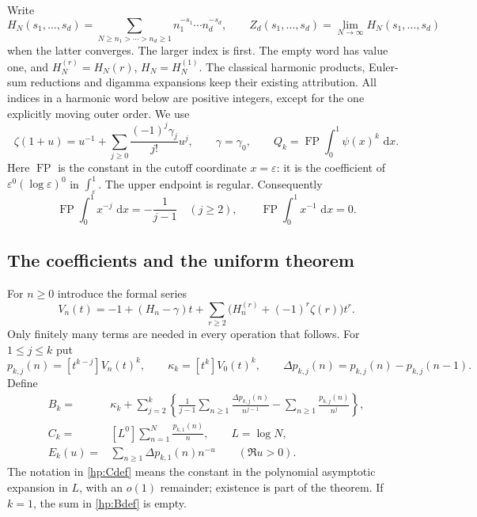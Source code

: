 \documentclass[11pt]{article}
\numberwithin{equation}{section}
\theoremstyle{plain}
\theoremstyle{definition}
\theoremstyle{remark}
\DeclareMathOperator{\FP}{FP}
\newcommand{\dd}{\,\mathrm d}
\begin{document}
Write
\[
 H_N(s_1,\ldots,s_d)
   =\sum_{N\ge n_1>\cdots>n_d\ge1}
             n_1^{-s_1}\cdots n_d^{-s_d},\qquad
 Z_d(s_1,\ldots,s_d)=\lim_{N\to\infty}H_N(s_1,\ldots,s_d)
\]
when the latter converges. The larger index is first. The empty word
has value one, and $H_N^{(r)}=H_N(r)$, $H_N=H_N^{(1)}$.
The classical harmonic products, Euler-sum reductions and digamma
expansions keep their existing attribution\cite{dlmf:psi,hoffman,mezo}.
All indices in a harmonic word below are positive integers, except
for the one explicitly moving outer order. We use
\[
 \zeta(1+u)=u^{-1}+\sum_{j\ge0}\frac{(-1)^j\gamma_j}{j!}u^j,
 \qquad \gamma=\gamma_0,
 \qquad Q_k=\FP\int_0^1\psi(x)^k\,\dd x.
\]
Here $\FP$ is the constant in the cutoff coordinate $x=\varepsilon$:
it is the coefficient of $\varepsilon^0(\log\varepsilon)^0$ in
$\int_\varepsilon^1$. The upper endpoint is regular. Consequently
\[
 \FP\int_0^1x^{-j}\,\dd x=-\frac1{j-1}\quad(j\ge2),
 \qquad \FP\int_0^1x^{-1}\,\dd x=0.
\]

\subsection{The coefficients and the uniform theorem}

For $n\ge0$ introduce the formal series
\begin{equation}\label{hp:V}
 V_n(t)=-1+(H_n-\gamma)t
           +\sum_{r\ge2}\bigl(H_n^{(r)}+(-1)^r\zeta(r)\bigr)t^r.
\end{equation}
Only finitely many terms are needed in every operation that follows.
For $1\le j\le k$ put
\begin{equation}\label{hp:pdef}
 p_{k,j}(n)=[t^{k-j}]V_n(t)^k,
 \qquad \kappa_k=[t^k]V_0(t)^k,
 \qquad \Delta p_{k,j}(n)=p_{k,j}(n)-p_{k,j}(n-1).
\end{equation}
Define
\begin{align}
 B_k={}&\kappa_k+
   \sum_{j=2}^k\left\{
    \frac1{j-1}\sum_{n\ge1}\frac{\Delta p_{k,j}(n)}{n^{j-1}}
        -\sum_{n\ge1}\frac{p_{k,j}(n)}{n^j}\right\},
       \label{hp:Bdef}\\
 C_k={}&[L^0]\sum_{n=1}^N\frac{p_{k,1}(n)}n,
       \qquad L=\log N,\label{hp:Cdef}\\
 E_k(u)={}&\sum_{n\ge1}\Delta p_{k,1}(n)n^{-u}
       \qquad(\Re u>0).\label{hp:Edef}
\end{align}
The notation in \eqref{hp:Cdef} means the constant in the polynomial
asymptotic expansion in $L$, with an $o(1)$ remainder; existence is
part of the theorem. If $k=1$, the sum in \eqref{hp:Bdef} is empty.
\end{document}
